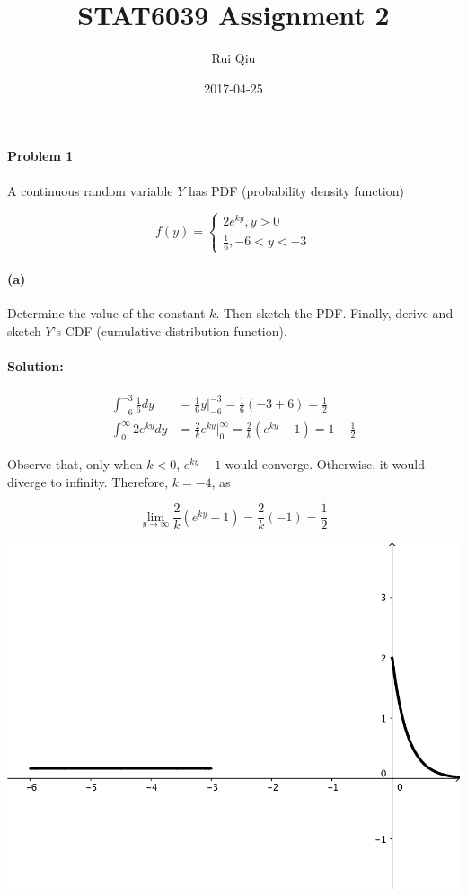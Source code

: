 \documentclass[a4paper, 11pt, twoside]{article}
\begin{document}
\title{STAT6039 Assignment 2}
\author{Rui Qiu}
\date{2017-04-25}

\maketitle

\paragraph{Problem 1} A continuous random variable $Y$ has PDF (probability density function)

\[ 
f(y)=
\begin{cases}
	2e^{ky}, y>0\\
	\frac{1}{6}, -6<y<-3      
\end{cases}
\]

\paragraph{(a)} Determine the  value of the constant $k$. Then sketch the PDF. Finally, derive and sketch $Y$'s CDF (cumulative distribution function).

\paragraph{Solution:}

\[
\begin{split}
	\int^{-3}_{-6}\frac{1}{6}dy &= \frac{1}{6}y\bigg\rvert^{-3}_{-6}=\frac{1}{6}(-3+6)=\frac{1}{2}\\
	\int^\infty_{0}2e^{ky}dy&=\frac{2}{k}e^{ky}\bigg\rvert^{\infty}_0=\frac{2}{k}(e^{ky}-1)=1-\frac{1}{2}
\end{split}
\]

Observe that, only when $k<0$, $e^{ky}-1$ would converge. Otherwise, it would diverge to infinity. Therefore, $k=-4$, as

\[\lim_{y\to\infty}\frac{2}{k}(e^{ky}-1)=\frac{2}{k}(-1)=\frac12\]

\includegraphics{image/1a-pdf}
\end{document}
